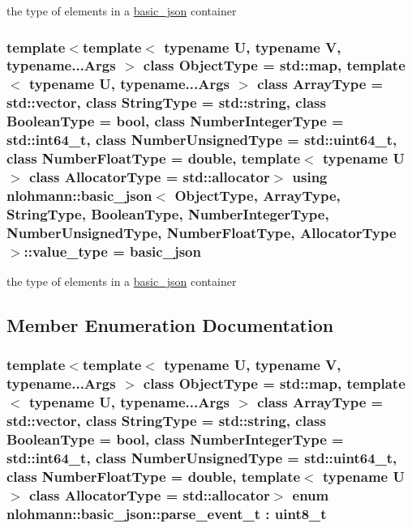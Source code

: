 the type of elements in a \hyperlink{classnlohmann_1_1basic__json}{basic\-\_\-json} container 

\hypertarget{classnlohmann_1_1basic__json_ac8d45b57874b4a6e9c07f7d3b5daa1f9}{
\subsubsection[{value\-\_\-type}]{\setlength{\rightskip}{0pt plus 5cm}template$<$template$<$ typename U, typename V, typename...\-Args $>$ class Object\-Type = std\-::map, template$<$ typename U, typename...\-Args $>$ class Array\-Type = std\-::vector, class String\-Type  = std\-::string, class Boolean\-Type  = bool, class Number\-Integer\-Type  = std\-::int64\-\_\-t, class Number\-Unsigned\-Type  = std\-::uint64\-\_\-t, class Number\-Float\-Type  = double, template$<$ typename U $>$ class Allocator\-Type = std\-::allocator$>$ using {\bf nlohmann\-::basic\-\_\-json}$<$ Object\-Type, Array\-Type, String\-Type, Boolean\-Type, Number\-Integer\-Type, Number\-Unsigned\-Type, Number\-Float\-Type, Allocator\-Type $>$\-::{\bf value\-\_\-type} =  {\bf basic\-\_\-json}}}\label{classnlohmann_1_1basic__json_ac8d45b57874b4a6e9c07f7d3b5daa1f9}


the type of elements in a \hyperlink{classnlohmann_1_1basic__json}{basic\-\_\-json} container 



\subsection{Member Enumeration Documentation}
\hypertarget{classnlohmann_1_1basic__json_aea1c863b719b4ca5b77188c171bbfafe}{
\subsubsection[{parse\-\_\-event\-\_\-t}]{\setlength{\rightskip}{0pt plus 5cm}template$<$template$<$ typename U, typename V, typename...\-Args $>$ class Object\-Type = std\-::map, template$<$ typename U, typename...\-Args $>$ class Array\-Type = std\-::vector, class String\-Type  = std\-::string, class Boolean\-Type  = bool, class Number\-Integer\-Type  = std\-::int64\-\_\-t, class Number\-Unsigned\-Type  = std\-::uint64\-\_\-t, class Number\-Float\-Type  = double, template$<$ typename U $>$ class Allocator\-Type = std\-::allocator$>$ enum {\bf nlohmann\-::basic\-\_\-json\-::parse\-\_\-event\-\_\-t} \-: uint8\-\_\-t\hspace{0.3cm}{\ttfamily [strong]}}}\label{classnlohmann_1_1basic__json_aea1c863b719b4ca5b77188c171bbfafe}


